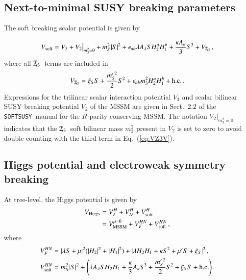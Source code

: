 \documentclass[final,3p,times,pdflatex]{elsarticle}
\def\SOFTSUSY{{\tt SOFTSUSY}}
\newcommand{\be}{\begin{equation}}
\newcommand{\ee}{\end{equation}}
\newcommand{\Zv}{\,\mathbf{\backslash}\mkern-11.0mu{\mathbb{Z}}_{3}} %
\newcommand{\ds}{\displaystyle}
\begin{document}
\subsection{Next-to-minimal SUSY breaking parameters \label{sec:susybreak}}
The soft breaking scalar potential is given by

\be 
V_{\textrm{soft}} = V_3 + V_2\big|^{}_{m_3^2=0} + m_S^2|S|^2 
+ \epsilon_{ab} \lambda A_\lambda S H^a_2 H^b_1 
+ \frac{\kappa A_\kappa}{3} S^3 + V_{\Zv} \,,
\ee 
%
where all $\Zv$~terms are included in
\be 
V_{\Zv} =  \xi_S S + \frac{m_S^{\prime \, 2}}{2} S^2
  + \epsilon_{ab} m_3^2 H_2^a H_1^b + \textrm{h.c.} \,.
\label{eq:VZ3V}
\ee
% 
Expressions for the trilinear scalar interaction potential $V_3$ and scalar 
bilinear SUSY breaking potential $V_2$  of the MSSM are given in Sect.\ 2.2 of 
the \SOFTSUSY~manual \cite{Allanach:2001kg} for the $R$-parity conserving MSSM.
 The notation $V_2\big|_{m_3^2=0}$ indicates that the $\Zv$~soft bilinear mass 
$m_3^2$ present in $V_2$ is set to zero to avoid double counting with the third term in Eq.~(\ref{eq:VZ3V}).

\subsection{Higgs potential and electroweak symmetry breaking}\label{sec:hpot}
At tree-level, the Higgs potential is given by
%
\begin{align}
V_\mathrm{Higgs} &=  V^H_F + V^H_D + V_{\rm soft}^H  \\
&=  V^{\mu=0}_\mathrm{MSSM} + V^{HN}_{F} + V_{\rm soft}^{HN}\,,
%
\end{align} 
where 
\begin{align}
V^{HN}_{F} &=   |\lambda S + \mu|^2 (|H_2|^2+|H_1|^2) + |\lambda H_2H_1
+\kappa S^2 + \mu^\prime S + \xi_S|^2  \,, \label{eq:HpotF} \\
 V_{\rm soft}^{HN}  &=   m_S^2|S|^2
+ \Bigg(\lambda A_{\lambda}SH_2H_1+\frac{\kappa}{3} A_{\kappa}S^3+ \ds\frac{m_S^{\prime \, 2}}{2} S^2 + \xi_S S + \textrm{h.c.} \Bigg)\,.
\label{eq:HpotS} 
\end{align}
\end{document}
